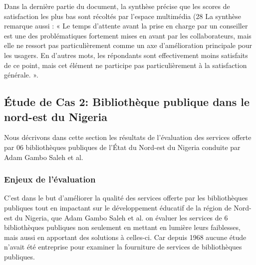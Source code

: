 \documentclass[french,a4paper,12pt]{article}
\begin{document}
{\quad Dans la dernière partie du document, la synthèse précise que les scores de satisfaction les plus bas sont récoltés par l’espace multimédia (28%
\quad La synthèse remarque aussi : « Le temps d’attente avant la prise en charge par un conseiller est une des problématiques fortement mises en avant par les collaborateurs, mais elle ne ressort pas particulièrement comme un axe d’amélioration principale pour les usagers. En d’autres mots, les répondants sont effectivement moins satisfaits de ce point, mais cet élément ne participe pas particulièrement à la satisfaction générale. ». 



\newpage
\subsection{Étude de Cas 2: Bibliothèque publique dans le nord-est du Nigeria \citep{Saleh}}
\quad Nous décrivons dans cette section les résultats de l'évaluation des services offerte par 06 bibliothèques publiques de l'État du Nord-est du Nigeria conduite par Adam Gambo Saleh et al. \\

\subsubsection{Enjeux de l'évaluation}
\quad C'est dans le but d'améliorer la qualité des services offerte par les bibliothèques publiques tout en impactant sur le développement éducatif de la région de Nord-est du Nigeria, que Adam Gambo Saleh et al. on évaluer les services de 6 bibliothèques publiques non seulement en mettant en lumière leurs faiblesses, mais aussi en apportant des solutions à celles-ci. Car depuis 1968 aucune étude n'avait été entreprise pour examiner la fourniture de services de bibliothèques publiques. \\

}
\end{document}
